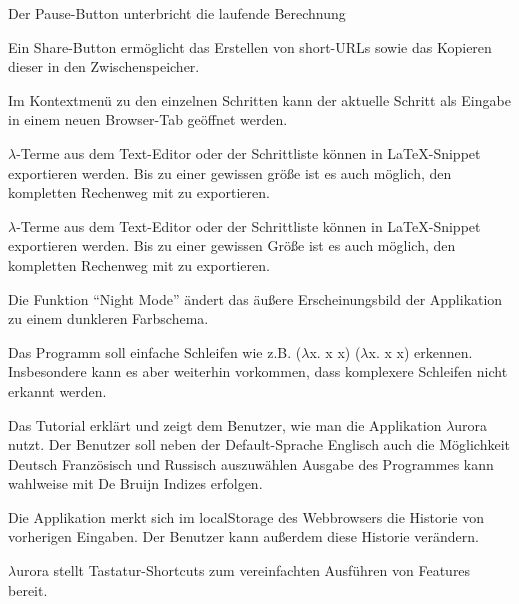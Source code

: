 \documentclass[parskip=full,11pt,twoside]{scrartcl}
\begin{document}
Der Pause-Button unterbricht die laufende Berechnung
 
Ein Share-Button ermöglicht das Erstellen von short-URLs sowie das Kopieren dieser in den Zwischenspeicher.

Im Kontextmenü zu den einzelnen Schritten kann der aktuelle Schritt als Eingabe in einem neuen Browser-Tab geöffnet werden.

$\lambda$-Terme aus dem Text-Editor oder der Schrittliste können in LaTeX-Snippet exportieren werden. Bis zu einer gewissen größe ist es auch möglich, den kompletten Rechenweg mit zu exportieren.


$\lambda$-Terme aus dem Text-Editor oder der Schrittliste können in LaTeX-Snippet exportieren werden. Bis zu einer gewissen Größe ist es auch möglich, den kompletten Rechenweg mit zu exportieren.


Die Funktion \enquote{Night Mode} ändert das äußere Erscheinungsbild der Applikation zu einem dunkleren Farbschema.

Das Programm soll einfache Schleifen wie z.B. ($\lambda$x. x x) ($\lambda$x. x x) erkennen. Insbesondere kann es aber weiterhin vorkommen, dass komplexere Schleifen nicht erkannt werden.

Das Tutorial erklärt und zeigt dem Benutzer, wie man die Applikation $\lambda$urora nutzt.
Der Benutzer soll neben der Default-Sprache Englisch auch die Möglichkeit Deutsch Französisch und Russisch auszuwählen
Ausgabe des Programmes kann wahlweise mit De Bruijn Indizes erfolgen.

Die Applikation merkt sich im localStorage des Webbrowsers die Historie von vorherigen Eingaben. Der Benutzer kann außerdem diese Historie verändern.

$\lambda$urora stellt Tastatur-Shortcuts zum vereinfachten Ausführen von Features bereit.
\end{document}
